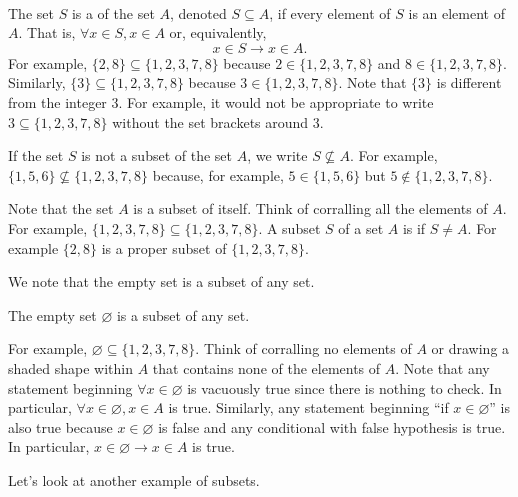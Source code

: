 \begin{defn}
\label{defn_subsets_formal}
~
    \begin{apart}
        \item The set $S$ is a  of the set $A$, denoted $S \subseteq A$, if every element of $S$ is an element of $A$. That is, $\forall x \in S, x \in A$ or, equivalently,
        $$x \in S \to x \in A.$$  For example, $\{2,8\} \subseteq \{1,2,3,7,8\}$ because $2 \in \{1,2,3,7,8\}$ and $8 \in \{1,2,3,7,8\} $. Similarly, $\{3\} \subseteq \{1,2,3,7,8\}$ because $3 \in \{1,2,3,7,8\}$. Note that $\{3\}$ is different from the integer 3. For example, it would not be appropriate to write $3 \subseteq \{1,2,3,7,8\}$ without the set brackets around 3.
        
        \item If the set $S$ is not a subset of the set $A$, we write $S \nsubseteq A$.  For example, $\{1,5,6\}\nsubseteq \{1,2,3,7,8\}$ because, for example, $5 \in \{1,5,6\}$ but $5 \notin \{1,2,3,7,8\}$.

        \item Note that the set $A$ is a subset of itself.  Think of corralling all the elements of $A$.  For example, $\{1,2,3,7,8\} \subseteq \{1,2,3,7,8\}$. A subset $S$ of a set $A$ is  if $S \neq A$.  For example $\{2,8\}$ is a proper subset of $\{1,2,3,7,8\}$. 
    \end{apart}
\end{defn}

We note that the empty set is a subset of any set.

\begin{rem}
\label{rem_empty_set_is_subset}
    The empty set $\varnothing$ is a subset of any set.
\end{rem}

For example, $\varnothing \subseteq \{1,2,3,7,8\}$.  Think of corralling no elements of $A$ or drawing a shaded shape within $A$ that contains none of the elements of $A$. Note that any statement beginning $\forall x \in \varnothing$ is vacuously true since there is nothing to check.  In particular, $\forall x \in \varnothing, x \in A$ is true.  Similarly, any statement beginning ``if $x \in \varnothing$'' is also true because $x \in \varnothing$ is false and any conditional with false hypothesis is true.  In particular, $x \in \varnothing \to x \in A$ is true. 

Let's look at another example of subsets.

